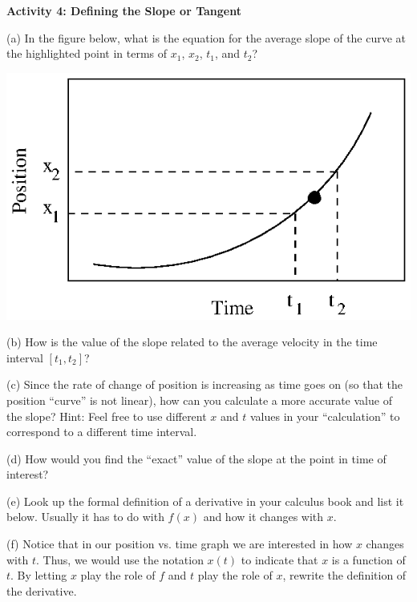 \textbf{Activity 4: Defining the Slope or Tangent} 

(a) In the figure below, what is the equation for the average slope of the curve
at the highlighted point in terms of \( x_{1} \), \( x_{2} \), \( t_{1} \),
and \( t_{2} \)?

\vspace{0.3cm}
{\par\raggedright \includegraphics{equations_fig2.eps} \par}
\vspace{0.3cm}

(b) How is the value of the slope related to the average velocity in the time
interval 
$[t_1,t_2]$?
\vspace{10mm}

(c) Since the rate of change of position is increasing as time goes on (so that
the position ``curve'' is not linear), how can you calculate
a more accurate value of the slope? Hint: Feel free to use different $x$ and 
$t$
values in your ``calculation'' to correspond to a different
time interval.
\vspace{20mm}

(d) How would you find the ``exact'' value of the slope at the
point in time of interest?
\vspace{20mm}

(e) Look up the formal definition of a derivative in your calculus book and
list it below. Usually it has to do with $f(x)$ and how it changes with $x$.
\vspace{20mm}

(f) Notice that in our position vs. time graph we are interested in how $x$ 
changes
with $t$. Thus, we would use the notation $x(t)$ to indicate that 
$x$ is a function
of $t$. By letting $x$ play the role of $f$ and $t$ play the role of 
$x$, rewrite the
definition of the derivative.
\vspace{20mm}

